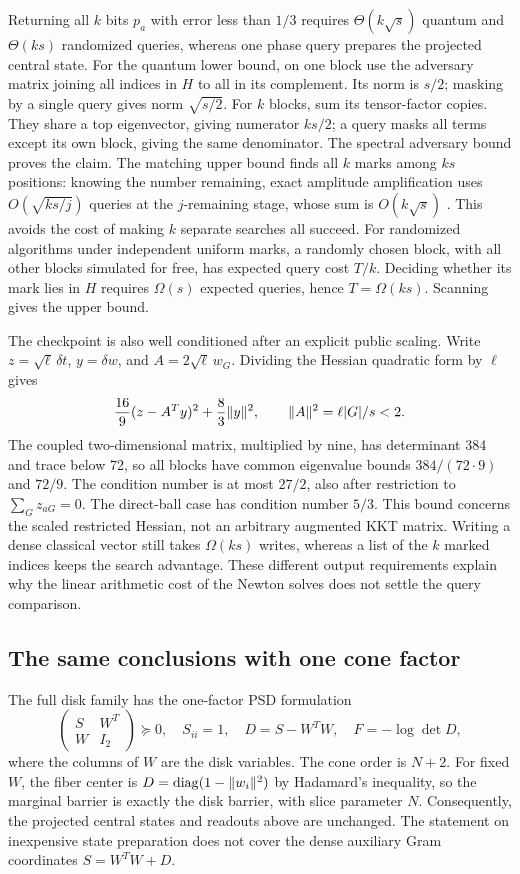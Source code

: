 Returning all $k$ bits $p_a$ with error less than $1/3$ requires
$\Theta(k\sqrt s)$ quantum and $\Theta(ks)$ randomized queries, whereas
one phase query prepares the projected central state. For the quantum lower bound, on one block use the adversary matrix
joining all indices in $H$ to all in its complement. Its norm is $s/2$;
masking by a single query gives norm $\sqrt{s/2}$. For $k$ blocks, sum its
tensor-factor copies. They share a top eigenvector, giving numerator
$ks/2$; a query masks all terms except its own block, giving the same
denominator. The spectral adversary bound
\citep{HoyerLeeSpalek2007} proves the claim. The matching upper bound finds
all $k$ marks among $ks$ positions: knowing the number remaining, exact
amplitude amplification uses $O(\sqrt{ks/j})$ queries at the $j$-remaining
stage, whose sum is $O(k\sqrt s)$ \citep{BHMT2002}. This avoids the
cost of making $k$ separate searches all succeed. For randomized
algorithms under independent uniform
marks, a randomly chosen block, with all other blocks simulated for free,
has expected query cost $T/k$. Deciding whether its mark lies in $H$
requires $\Omega(s)$ expected queries, hence $T=\Omega(ks)$. Scanning gives the upper bound.

The checkpoint is also well conditioned after an explicit public scaling.
Write $z=\sqrt\ell\,\delta t$, $y=\delta w$, and
$A=2\sqrt\ell\,w_G$. Dividing the Hessian quadratic form by $\ell$ gives
\[
 \frac{16}{9}(z-A^Ty)^2+\frac83\lVert y\rVert^2,
 \qquad \lVert A\rVert^2=\ell|G|/s<2.
\]
The coupled two-dimensional matrix, multiplied by nine, has determinant
384 and trace below 72, so all blocks have common eigenvalue bounds
$384/(72\cdot9)$ and $72/9$. The condition number is at most $27/2$,
also after restriction to $\sum_Gz_{aG}=0$. The direct-ball case has
condition number $5/3$. This bound concerns the scaled restricted
Hessian, not an arbitrary augmented KKT matrix. Writing a dense classical
vector still takes $\Omega(ks)$ writes, whereas a list of the $k$ marked
indices keeps the search advantage. These different output requirements
explain why the linear arithmetic cost of the Newton solves does not
settle the query comparison.

\subsection{The same conclusions with one cone factor}
The full disk family has the one-factor PSD formulation
\begin{equation}\label{query:one-psd}
 \begin{pmatrix}S&W^T\\W&I_2\end{pmatrix}\succeq0,
 \quad S_{ii}=1,
 \quad D=S-W^TW,
 \quad F=-\log\det D,
\end{equation}
where the columns of $W$ are the disk variables. The cone order is
$N+2$.
For fixed $W$, the fiber center is
$D=\operatorname{diag}(1-\lVert w_i\rVert^2)$ by Hadamard's inequality, so the
marginal barrier is exactly the disk barrier, with slice parameter $N$.
Consequently, the projected central states and readouts above are
unchanged. The statement on inexpensive state preparation does not cover the
dense auxiliary Gram coordinates $S=W^TW+D$.

